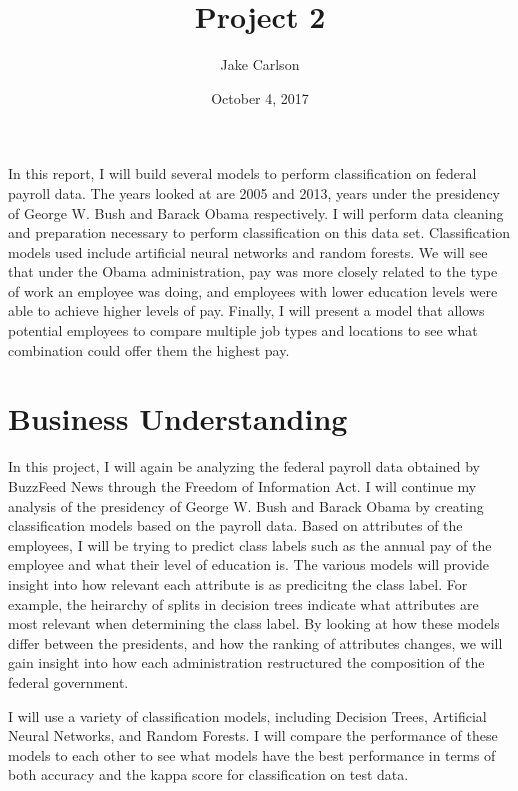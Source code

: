 \documentclass{article}
\begin{document}
\title{Project 2}
\author{Jake Carlson}
\date{October 4, 2017}
\maketitle

\abstract
In this report, I will build several models to perform classification on federal payroll data. The years looked at are 2005 and 2013, years under the presidency of George W. Bush and Barack Obama respectively. I will perform data cleaning and preparation necessary to perform classification on this data set. Classification models used include artificial neural networks and random forests. We will see that under the Obama administration, pay was more closely related to the type of work an employee was doing, and employees with lower education levels were able to achieve higher levels of pay. Finally, I will present a model that allows potential employees to compare multiple job types and locations to see what combination could offer them the highest pay.
\newpage

\tableofcontents
\newpage

\section{Business Understanding}
In this project, I will again be analyzing the federal payroll data obtained by BuzzFeed News through the Freedom of Information Act. I will continue my analysis of the presidency of George W. Bush and Barack Obama by creating classification models based on the payroll data. Based on attributes of the employees, I will be trying to predict class labels such as the annual pay of the employee and what their level of education is. The various models will provide insight into how relevant each attribute is as predicitng the class label. For example, the heirarchy of splits in decision trees indicate what attributes are most relevant when determining the class label. By looking at how these models differ between the presidents, and how the ranking of attributes changes, we will gain insight into how each administration restructured the composition of the federal government.
\par
I will use a variety of classification models, including Decision Trees, Artificial Neural Networks, and Random Forests. I will compare the performance of these models to each other to see what models have the best performance in terms of both accuracy and the kappa score for classification on test data.
\end{document}
